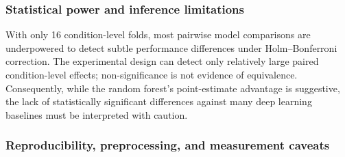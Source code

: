 \subsubsection{Statistical power and inference limitations}\label{power-limitations}

With only 16 condition-level folds, most pairwise model comparisons are underpowered to detect subtle performance differences under Holm--Bonferroni correction. The experimental design can detect only relatively large paired condition-level effects; non-significance is not evidence of equivalence. Consequently, while the random forest's point-estimate advantage is suggestive, the lack of statistically significant differences against many deep learning baselines must be interpreted with caution.

\subsubsection{Reproducibility, preprocessing, and measurement
caveats}\label{reproducibility-caveats}

